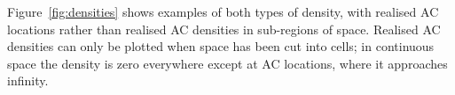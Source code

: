 \documentclass[useAMS,usenatbib,referee]{biom}
\begin{document}

Figure~\ref{fig:densities} shows examples of both types of density, with realised AC locations rather than realised AC densities in sub-regions of space. Realised AC densities can only be plotted when space has been cut into cells; in continuous space the density is zero everywhere except at AC locations, where it approaches infinity.
\end{document}
